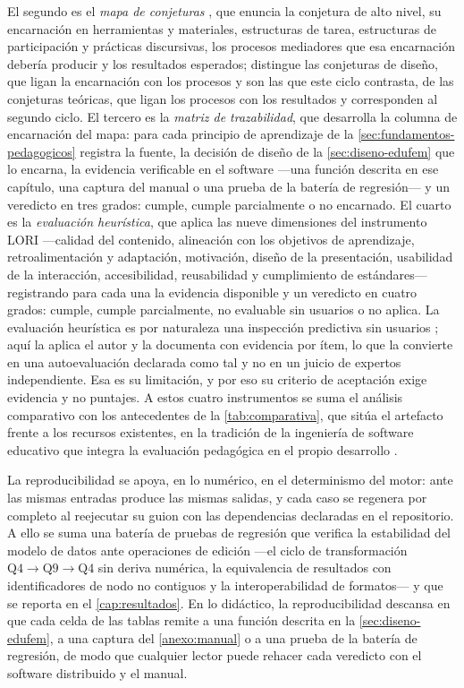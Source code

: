 El segundo es el \emph{mapa de conjeturas} \autocite{sandoval2014conjecture}, que enuncia la conjetura de alto nivel, su encarnación en herramientas y materiales, estructuras de tarea, estructuras de participación y prácticas discursivas, los procesos mediadores que esa encarnación debería producir y los resultados esperados; distingue las conjeturas de diseño, que ligan la encarnación con los procesos y son las que este ciclo contrasta, de las conjeturas teóricas, que ligan los procesos con los resultados y corresponden al segundo ciclo. El tercero es la \emph{matriz de trazabilidad}, que desarrolla la columna de encarnación del mapa: para cada principio de aprendizaje de la \autoref{sec:fundamentos-pedagogicos} registra la fuente, la decisión de diseño de la \autoref{sec:diseno-edufem} que lo encarna, la evidencia verificable en el software —una función descrita en ese capítulo, una captura del manual o una prueba de la batería de regresión— y un veredicto en tres grados: cumple, cumple parcialmente o no encarnado. El cuarto es la \emph{evaluación heurística}, que aplica las nueve dimensiones del instrumento LORI \autocite{leacock2007framework} —calidad del contenido, alineación con los objetivos de aprendizaje, retroalimentación y adaptación, motivación, diseño de la presentación, usabilidad de la interacción, accesibilidad, reusabilidad y cumplimiento de estándares— registrando para cada una la evidencia disponible y un veredicto en cuatro grados: cumple, cumple parcialmente, no evaluable sin usuarios o no aplica. La evaluación heurística es por naturaleza una inspección predictiva sin usuarios \autocite{squires1999predicting}; aquí la aplica el autor y la documenta con evidencia por ítem, lo que la convierte en una autoevaluación declarada como tal y no en un juicio de expertos independiente. Esa es su limitación, y por eso su criterio de aceptación exige evidencia y no puntajes. A estos cuatro instrumentos se suma el análisis comparativo con los antecedentes de la \autoref{tab:comparativa}, que sitúa el artefacto frente a los recursos existentes, en la tradición de la ingeniería de software educativo que integra la evaluación pedagógica en el propio desarrollo \autocite{galvis1992ingenieria,cataldi2000metodologia}.

La reproducibilidad se apoya, en lo numérico, en el determinismo del motor: ante las mismas entradas produce las mismas salidas, y cada caso se regenera por completo al reejecutar su guion con las dependencias declaradas en el repositorio. A ello se suma una batería de pruebas de regresión que verifica la estabilidad del modelo de datos ante operaciones de edición —el ciclo de transformación $\text{Q4}\rightarrow\text{Q9}\rightarrow\text{Q4}$ sin deriva numérica, la equivalencia de resultados con identificadores de nodo no contiguos y la interoperabilidad de formatos— y que se reporta en el \autoref{cap:resultados}. En lo didáctico, la reproducibilidad descansa en que cada celda de las tablas remite a una función descrita en la \autoref{sec:diseno-edufem}, a una captura del \autoref{anexo:manual} o a una prueba de la batería de regresión, de modo que cualquier lector puede rehacer cada veredicto con el software distribuido y el manual.

